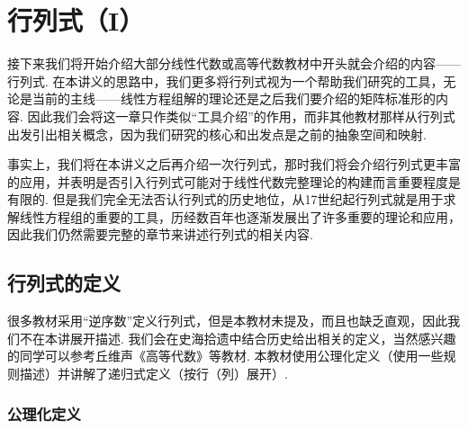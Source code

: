 \chapter{行列式（I）}

接下来我们将开始介绍大部分线性代数或高等代数教材中开头就会介绍的内容——行列式. 在本讲义的思路中，我们更多将行列式视为一个帮助我们研究的工具，无论是当前的主线——线性方程组解的理论还是之后我们要介绍的矩阵标准形的内容. 因此我们会将这一章只作类似``工具介绍''的作用，而非其他教材那样从行列式出发引出相关概念，因为我们研究的核心和出发点是之前的抽象空间和映射.

事实上，我们将在本讲义之后再介绍一次行列式，那时我们将会介绍行列式更丰富的应用，并表明是否引入行列式可能对于线性代数完整理论的构建而言重要程度是有限的. 但是我们完全无法否认行列式的历史地位，从17世纪起行列式就是用于求解线性方程组的重要的工具，历经数百年也逐渐发展出了许多重要的理论和应用，因此我们仍然需要完整的章节来讲述行列式的相关内容.

\section{行列式的定义}

很多教材采用``逆序数''定义行列式，但是本教材未提及，而且也缺乏直观，因此我们不在本讲展开描述. 我们会在史海拾遗中结合历史给出相关的定义，当然感兴趣的同学可以参考丘维声《高等代数》等教材. 本教材使用公理化定义（使用一些规则描述）并讲解了递归式定义（按行（列）展开）.

\subsection{公理化定义}

